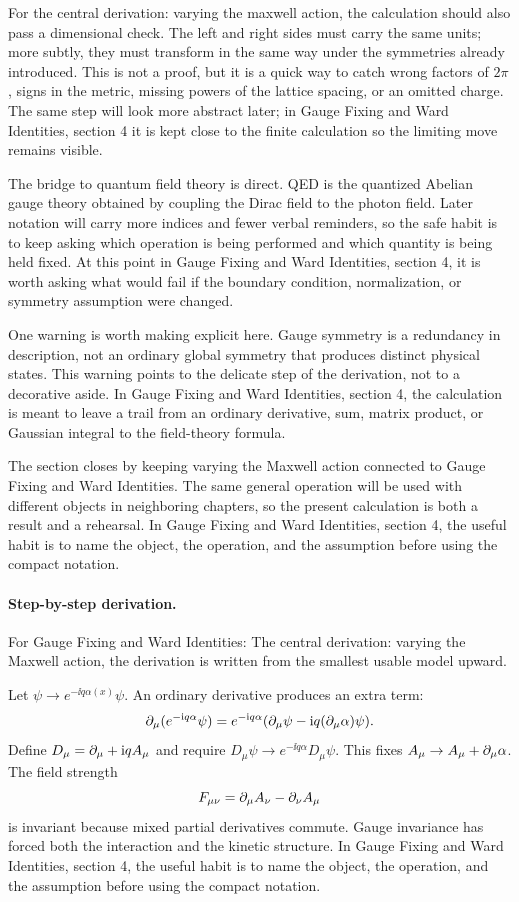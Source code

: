 For the central derivation: varying the maxwell action, the calculation should also pass a dimensional check.  The left and right sides must carry the same units; more subtly, they must transform in the same way under the symmetries already introduced.  This is not a proof, but it is a quick way to catch wrong factors of \(2\pi\), signs in the metric, missing powers of the lattice spacing, or an omitted charge.  The same step will look more abstract later; in Gauge Fixing and Ward Identities, section 4 it is kept close to the finite calculation so the limiting move remains visible.

The bridge to quantum field theory is direct.  QED is the quantized Abelian gauge theory obtained by coupling the Dirac field to the photon field.  Later notation will carry more indices and fewer verbal reminders, so the safe habit is to keep asking which operation is being performed and which quantity is being held fixed.  At this point in Gauge Fixing and Ward Identities, section 4, it is worth asking what would fail if the boundary condition, normalization, or symmetry assumption were changed.

One warning is worth making explicit here.  Gauge symmetry is a redundancy in description, not an ordinary global symmetry that produces distinct physical states.  This warning points to the delicate step of the derivation, not to a decorative aside.  In Gauge Fixing and Ward Identities, section 4, the calculation is meant to leave a trail from an ordinary derivative, sum, matrix product, or Gaussian integral to the field-theory formula.

The section closes by keeping varying the Maxwell action connected to Gauge Fixing and Ward Identities.  The same general operation will be used with different objects in neighboring chapters, so the present calculation is both a result and a rehearsal.  In Gauge Fixing and Ward Identities, section 4, the useful habit is to name the object, the operation, and the assumption before using the compact notation.



\paragraph{Step-by-step derivation.}

For Gauge Fixing and Ward Identities: The central derivation: varying the Maxwell action, the derivation is written from the smallest usable model upward.

Let \(\psi\to e^{-\ii q\alpha(x)}\psi\).  An ordinary derivative produces an extra term:
\[
  \partial_\mu(e^{-\mathrm i q\alpha}\psi)
  =
  e^{-\mathrm i q\alpha}(\partial_\mu\psi-\mathrm i q(\partial_\mu\alpha)\psi).
\]
Define \(D_\mu=\partial_\mu+\mathrm i qA_\mu\) and require \(D_\mu\psi\to e^{-\ii q\alpha}D_\mu\psi\).  This fixes \(A_\mu\to A_\mu+\partial_\mu\alpha\).  The field strength
\[
  F_{\mu\nu}=\partial_\mu A_\nu-\partial_\nu A_\mu
\]
is invariant because mixed partial derivatives commute.  Gauge invariance has forced both the interaction and the kinetic structure.  In Gauge Fixing and Ward Identities, section 4, the useful habit is to name the object, the operation, and the assumption before using the compact notation.

